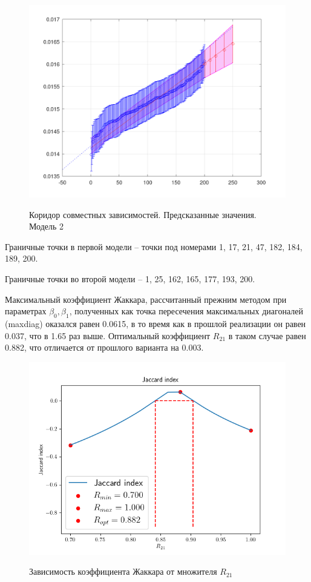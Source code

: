 \begin{figure}[H]
	\begin{center}
		\includegraphics[scale=0.32]{prediction_2}
		\label{pic:prediction2}
		\caption{Коридор совместных зависимостей. Предсказанные значения. Модель 2}
	\end{center}
\end{figure}

Граничные точки в первой модели -- точки под номерами 1, 17, 21, 47, 182, 184, 189, 200.

Граничные точки во второй модели -- 1, 25, 162, 165, 177, 193, 200.


Максимальный коэффициент Жаккара, рассчитанный прежним методом при параметрах $\beta_0, \beta_1$, полученных как точка пересечения максимальных диагоналей (maxdiag) оказался равен 0.0615, в то время как в прошлой реализации он равен 0.037, что в 1.65 раз выше. Оптимальный коэффициент $R_{21}$ в таком случае равен 0.882, что отличается от прошлого варианта на 0.003.

\begin{figure}[H]
	\begin{center}
		\includegraphics[scale=0.52]{jaccard}
		\label{pic:jaccard}
		\caption{Зависимость коэффициента Жаккара от множителя $R_{21}$}
	\end{center}
\end{figure}

